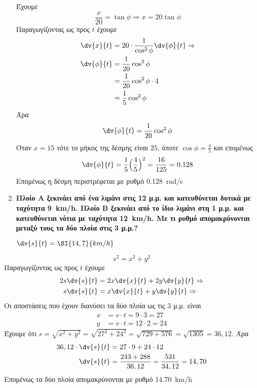 \begin{enumerate}
	Έχουμε
	\[
		\frac{x}{20}=\tan\phi \Rightarrow x=20\tan\phi
	\]
	Παραγωγίζοντας ως προς $t$ έχουμε
	\begin{align*}
		\dv{x}{t} &= 20\cdot \frac{1}{\cos^{2}\phi}\dv{\phi}{t} \notag \Rightarrow \\
		\dv{\phi}{t}&=\frac{1}{20}\cos^{2}\phi \\
					&=\frac{1}{20}\cos^{2}\phi\cdot 4 \\
					&=\frac{1}{5}\cos^{2}\phi
	\end{align*}
	Άρα
	\begin{equation} \label{eq:anglerate}
		\dv{\phi}{t}=\frac{1}{20}\cos^{2}\phi
\end{equation}
Όταν $x=15$ τότε το μήκος της δέσμης είναι $25$, όποτε $\cos\phi = \frac{4}{5}$ και επομένως
\[
	\dv{\phi}{t} = \frac{1}{5}\Bigl(\frac{4}{5}\Bigr)^{2} = \frac{16}{125} = 0.128
\]
Επομένως η δέσμη περιστρέφεται με ρυθμό \SI{0.128}{rad/s}


	\item {\bfseries \boldmath Πλοίο Α ξεκινάει από ένα λιμάνι στις 12 μ.μ. και κατευθύνεται δυτικά
		με ταχύτητα  \SI{9}{km/h}. Πλοίο Β ξεκινάει από το ίδιο λιμάνι στη 1
		μ.μ. και κατευθύνεται νότια με ταχύτητα \SI{12}{km/h}. Με τι ρυθμό
	απομακρύνονται μεταξύ τους τα δύο πλοία στις 3 μ.μ.?}

		\hfill $ \dv{s}{t} = \SI{14,7}{km/h} $
\end{enumerate}



	\[
		s^{2} = x^{2} + y^{2}
	\]
	Παραγωγίζοντας ως προς $t$ έχουμε
	\begin{align*}
		2s \dv{s}{t} & = 2x\dv{x}{t} + 2y\dv{y}{t} \Rightarrow \\
		s \dv{s}{t} & = x\dv{x}{t} + y\dv{y}{t} \Rightarrow \\
	\end{align*}
	Οι αποστάσεις που έχουν διανύσει τα δύο πλοία ως τις $3$ μ.μ. είναι
	\begin{align*}
		x &= v\cdot t = 9 \cdot 3 = 27 \\
		y &= v\cdot t = 12 \cdot 2 = 24
	\end{align*}
	Έχουμε ότι $ s = \sqrt{x^{2} + y^{2}} = \sqrt{27^{2} + 24^{2}} =
	\sqrt{729 + 576} = \sqrt{1305} = 36,12$.
	Άρα 
	\begin{align}
		36,12 \cdot \dv{s}{t} &= 27\cdot 9 + 24 \cdot 12 \\
		\dv{s}{t} &= \frac{243 + 288}{36,12} = \frac{531}{34,12} = 14,70
	\end{align}
	Επομένως τα δύο πλοία απομακρύνονται με ρυθμό \SI{14,70}{km/h}





   
